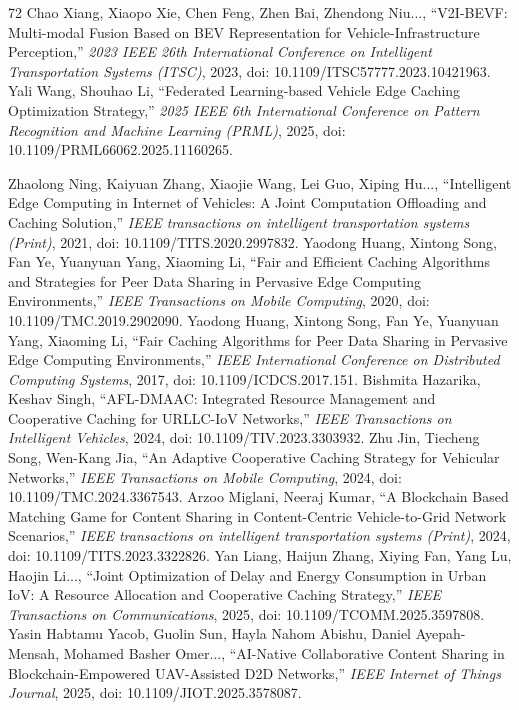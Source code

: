 \documentclass[journal]{IEEEtran}
\begin{document}
\begin{thebibliography}{72}
Chao Xiang, Xiaopo Xie, Chen Feng, Zhen Bai, Zhendong Niu..., ``V2I-BEVF: Multi-modal Fusion Based on BEV Representation for Vehicle-Infrastructure Perception,'' \textit{2023 IEEE 26th International Conference on Intelligent Transportation Systems (ITSC)}, 2023, doi: 10.1109/ITSC57777.2023.10421963.
Yali Wang, Shouhao Li, ``Federated Learning-based Vehicle Edge Caching Optimization Strategy,'' \textit{2025 IEEE 6th International Conference on Pattern Recognition and Machine Learning (PRML)}, 2025, doi: 10.1109/PRML66062.2025.11160265.

Zhaolong Ning, Kaiyuan Zhang, Xiaojie Wang, Lei Guo, Xiping Hu..., ``Intelligent Edge Computing in Internet of Vehicles: A Joint Computation Offloading and Caching Solution,'' \textit{IEEE transactions on intelligent transportation systems (Print)}, 2021, doi: 10.1109/TITS.2020.2997832.
Yaodong Huang, Xintong Song, Fan Ye, Yuanyuan Yang, Xiaoming Li, ``Fair and Efficient Caching Algorithms and Strategies for Peer Data Sharing in Pervasive Edge Computing Environments,'' \textit{IEEE Transactions on Mobile Computing}, 2020, doi: 10.1109/TMC.2019.2902090.
Yaodong Huang, Xintong Song, Fan Ye, Yuanyuan Yang, Xiaoming Li, ``Fair Caching Algorithms for Peer Data Sharing in Pervasive Edge Computing Environments,'' \textit{IEEE International Conference on Distributed Computing Systems}, 2017, doi: 10.1109/ICDCS.2017.151.
Bishmita Hazarika, Keshav Singh, ``AFL-DMAAC: Integrated Resource Management and Cooperative Caching for URLLC-IoV Networks,'' \textit{IEEE Transactions on Intelligent Vehicles}, 2024, doi: 10.1109/TIV.2023.3303932.
Zhu Jin, Tiecheng Song, Wen-Kang Jia, ``An Adaptive Cooperative Caching Strategy for Vehicular Networks,'' \textit{IEEE Transactions on Mobile Computing}, 2024, doi: 10.1109/TMC.2024.3367543.
Arzoo Miglani, Neeraj Kumar, ``A Blockchain Based Matching Game for Content Sharing in Content-Centric Vehicle-to-Grid Network Scenarios,'' \textit{IEEE transactions on intelligent transportation systems (Print)}, 2024, doi: 10.1109/TITS.2023.3322826.
Yan Liang, Haijun Zhang, Xiying Fan, Yang Lu, Haojin Li..., ``Joint Optimization of Delay and Energy Consumption in Urban IoV: A Resource Allocation and Cooperative Caching Strategy,'' \textit{IEEE Transactions on Communications}, 2025, doi: 10.1109/TCOMM.2025.3597808.
Yasin Habtamu Yacob, Guolin Sun, Hayla Nahom Abishu, Daniel Ayepah-Mensah, Mohamed Basher Omer..., ``AI-Native Collaborative Content Sharing in Blockchain-Empowered UAV-Assisted D2D Networks,'' \textit{IEEE Internet of Things Journal}, 2025, doi: 10.1109/JIOT.2025.3578087.

\end{thebibliography}
\end{document}
